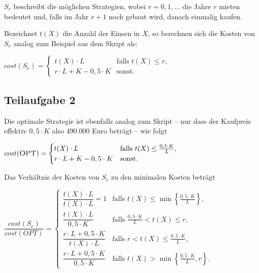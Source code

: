 \documentclass[a4paper, fontsize=10pt]{scrartcl}
\begin{document}
$S_r$ beschreibt die möglichen Strategien, wobei $r=0,1,\dots$ die Jahre $r$ mieten bedeutet und, falls im Jahr $r+1$ noch gebaut wird, danach einmalig kaufen.\smallskip

Bezeichnet $t(X)$ die Anzahl der Einsen in $X$, so berechnen sich die Kosten von $S_r$ analog zum Beispiel aus dem Skript als:\bigskip

$cost(S_r) = \begin{cases}

t(X)\cdot L&\textrm{falls $t(X)\leq r$},\\
r\cdot L+K-0,5\cdot K & \textrm{sonst.}
        
  \end{cases}      $

\subsection*{Teilaufgabe 2}
Die optimale Strategie ist ebenfalls analog zum Skript -- nur dass der Kaufpreis effektiv $0,5\cdot K$ also $490.000$ Euro beträgt -- wie folgt\bigskip

$cost(\textsc{OPT}) = \begin{cases}

t(X)\cdot L&\textrm{falls $t(X)\leq \frac{0,5\cdot K}{L}$},\\
r\cdot L+K-0,5\cdot K & \textrm{sonst.}
        
  \end{cases}$\smallskip
  
\newpage
Das Verhältnis der Kosten von $S_r$ zu den minimalen Kosten beträgt\bigskip


$\dfrac{cost(S_r)}{cost(OPT)} = \begin{cases}

    \dfrac{t(X)\cdot L}{t(X)\cdot L}=1                  &\textrm{falls $t(X)\leq \min \left \{\frac{0,5\cdot K}{L} \right \}$},\\[5mm]

    \dfrac{t(X)\cdot L}{0,5\cdot K}                    & \textrm{falls $\frac{0,5\cdot K}{L}< t(X)\leq r$,} \\[5mm]

    \dfrac{r\cdot L + 0,5\cdot K}{t(X)\cdot L}         & \textrm{falls $r<t(X)\leq \frac{0,5\cdot K}{L}$,} \\[5mm]

    \dfrac{r\cdot L+0,5\cdot K}{0,5\cdot K}            & \textrm{falls $t(X) > \min \left \{ \frac{0,5\cdot K}{L},r \right \} $.}
            
    \end{cases}$
    
\end{document}
